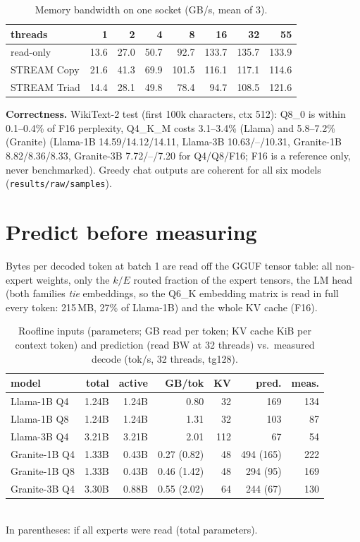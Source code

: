 \documentclass[10pt,twocolumn]{article}
\newcommand{\tps}{tok/s}
\begin{document}
\begin{table}[t]\centering\footnotesize\setlength{\tabcolsep}{3.5pt}
\caption{Memory bandwidth on one socket (GB/s, mean of 3).}\label{tab:bw}
\begin{tabular}{lrrrrrrr}\toprule
threads & 1 & 2 & 4 & 8 & 16 & 32 & 55\\\midrule
read-only & 13.6 & 27.0 & 50.7 & 92.7 & 133.7 & 135.7 & 133.9\\
STREAM Copy & 21.6 & 41.3 & 69.9 & 101.5 & 116.1 & 117.1 & 114.6\\
STREAM Triad & 14.4 & 28.1 & 49.8 & 78.4 & 94.7 & 108.5 & 121.6\\\bottomrule
\end{tabular}\end{table}

\textbf{Correctness.} WikiText-2 test (first 100k characters, ctx 512): Q8\_0 is within 0.1--0.4\% of F16 perplexity,
Q4\_K\_M costs 3.1--3.4\% (Llama) and 5.8--7.2\% (Granite) (Llama-1B 14.59/14.12/14.11, Llama-3B 10.63/--/10.31,
Granite-1B 8.82/8.36/8.33, Granite-3B 7.72/--/7.20 for Q4/Q8/F16; F16 is a reference only, never benchmarked). Greedy chat
outputs are coherent for all six models (\texttt{results/raw/samples}).

\section{Predict before measuring}
Bytes per decoded token at batch 1 are read off the GGUF tensor table: all non-expert weights, only the
$k/E$ routed fraction of the expert tensors, the LM head (both families \emph{tie} embeddings, so the Q6\_K embedding
matrix is read in full every token: 215\,MB, 27\% of Llama-1B) and the whole KV cache (F16).
\begin{table}[t]\centering\scriptsize\setlength{\tabcolsep}{2.2pt}
\caption{Roofline inputs (parameters; GB read per token; KV cache KiB per context token) and prediction (read BW at 32 threads) vs.\ measured decode (\tps, 32 threads, tg128).}\label{tab:bytes}
\begin{tabular}{lrrrrrr}\toprule
model & total & active & GB/tok & KV & pred. & meas.\\\midrule
Llama-1B Q4  & 1.24B & 1.24B & 0.80 & 32 & 169 & 134\\
Llama-1B Q8  & 1.24B & 1.24B & 1.31 & 32 & 103 & 87\\
Llama-3B Q4  & 3.21B & 3.21B & 2.01 & 112 & 67 & 54\\
Granite-1B Q4 & 1.33B & 0.43B & 0.27 (0.82) & 48 & 494 (165) & 222\\
Granite-1B Q8 & 1.33B & 0.43B & 0.46 (1.42) & 48 & 294 (95) & 169\\
Granite-3B Q4 & 3.30B & 0.88B & 0.55 (2.02) & 64 & 244 (67) & 130\\\bottomrule
\end{tabular}\\[1pt]{\scriptsize In parentheses: if all experts were read (total parameters).}
\end{table}
\end{document}
